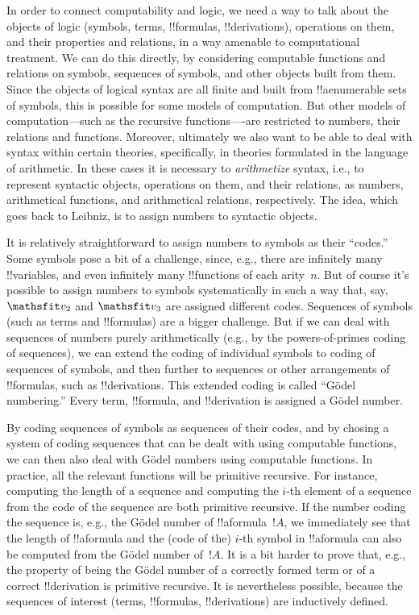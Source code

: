 \documentclass[../../../include/open-logic-section]{subfiles}
\begin{document}

In order to connect computability and logic, we need a way to talk
about the objects of logic (symbols, terms, !!{formula}s,
!!{derivation}s), operations on them, and their properties and
relations, in a way amenable to computational treatment.  We can do
this directly, by considering computable functions and relations on
symbols, sequences of symbols, and other objects built from them.
Since the objects of logical syntax are all finite and built from
!!a{enumerable} sets of symbols, this is possible for some models of
computation.  But other models of computation---such as the recursive
functions----are restricted to numbers, their relations and functions.
Moreover, ultimately we also want to be able to deal with syntax
within certain theories, specifically, in theories formulated in the
language of arithmetic.  In these cases it is necessary to
\emph{arithmetize} syntax, i.e., to represent syntactic objects,
operations on them, and their relations, as numbers, arithmetical
functions, and arithmetical relations, respectively. The idea, which
goes back to Leibniz, is to assign numbers to syntactic objects.

It is relatively straightforward to assign numbers to symbols as their
``codes.''  Some symbols pose a bit of a challenge, since, e.g., there
are infinitely many !!{variable}s, and even infinitely many
!!{function}s of each arity~$n$. But of course it's possible to assign
numbers to symbols systematically in such a way that, say, $\Obj v_2$
and $\Obj v_3$ are assigned different codes. Sequences of symbols
(such as terms and !!{formula}s) are a bigger challenge. But if we can
deal with sequences of numbers purely arithmetically (e.g., by the
powers-of-primes coding of sequences), we can extend the coding of
individual symbols to coding of sequences of symbols, and then further
to sequences or other arrangements of !!{formula}s, such as
!!{derivation}s. This extended coding is called ``G\"odel numbering.''
Every term, !!{formula}, and !!{derivation} is assigned a G\"odel
number.

By coding sequences of symbols as sequences of their codes, and by
chosing a system of coding sequences that can be dealt with using
computable functions, we can then also deal with G\"odel numbers using
computable functions.  In practice, all the relevant functions will be
primitive recursive.  For instance, computing the length of a sequence
and computing the $i$-th element of a sequence from the code of the
sequence are both primitive recursive. If the number coding the
sequence is, e.g., the G\"odel number of !!a{formula}~$!A$, we
immediately see that the length of !!a{formula} and the (code of the)
$i$-th symbol in !!a{formula} can also be computed from the G\"odel
number of~$!A$. It is a bit harder to prove that, e.g., the property
of being the G\"odel number of a correctly formed term or of a correct
!!{derivation} is primitive recursive.  It is nevertheless possible,
because the sequences of interest (terms, !!{formula}s,
!!{derivation}s) are inductively defined.
\end{document}
